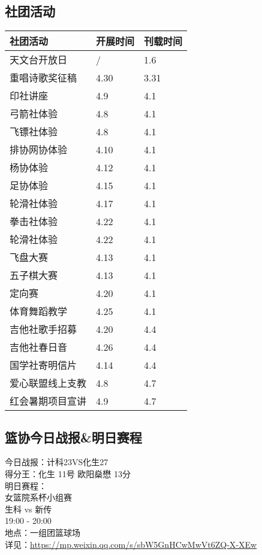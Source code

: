 \documentclass[letterpaper, 12pt]{article}
\begin{document}
\begin{multicols}{2}
\section{社团活动}
\begin{tabular}{|>{\centering\arraybackslash}m{}|m{}|m{}|}
    \hline
    社团活动 & 开展时间 & 刊载时间\\
    \hline\hline
    天文台开放日 & / & 1.6\\
    重唱诗歌奖征稿 & 4.30 & 3.31\\
    印社讲座 & 4.9 & 4.1\\
    弓箭社体验 & 4.8 & 4.1\\
    飞镖社体验 & 4.8 & 4.1\\
    排协网协体验 & 4.10 & 4.1\\
    杨协体验 & 4.12 & 4.1\\
    足协体验 & 4.15 & 4.1\\
    轮滑社体验 & 4.17 & 4.1\\
    拳击社体验 & 4.22 & 4.1\\
    轮滑社体验 & 4.22 & 4.1\\
    飞盘大赛 & 4.13 & 4.1\\
    五子棋大赛 & 4.13 & 4.1\\
    定向赛 & 4.20 & 4.1\\
    体育舞蹈教学 & 4.25 & 4.1\\
    吉他社歌手招募 & 4.20 & 4.4\\
    吉他社春日音 & 4.26 & 4.4\\
    国学社寄明信片 & 4.14 & 4.4\\
    爱心联盟线上支教 & 4.8 & 4.7\\
    红会暑期项目宣讲 & 4.9 & 4.7\\
    \hline
\end{tabular}

\subsection{篮协今日战报\&明日赛程}
今日战报：计科23VS化生27
\\得分王：化生 11号 欧阳燊懋 13分
\\明日赛程：
\\女篮院系杯小组赛
\\生科 vs 新传 
\\19:00 - 20:00
\\地点：一组团篮球场
\\详见：\url{https://mp.weixin.qq.com/s/sbW5GnHCwMwVt6ZQ-X-XEw}


\end{multicols}
\end{document}
